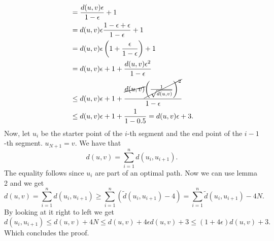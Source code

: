 \documentclass[11pt]{article}
\begin{document}
\begin{enumerate}
\begin{align*}
          & = \frac{d(u,v)\epsilon}{1 - \epsilon} + 1\\
          &=  d(u,v)\epsilon \frac{1-\epsilon+\epsilon}{1-\epsilon} + 1 \\
          &= d(u,v)\epsilon \left(1+\frac{\epsilon}{1-\epsilon}\right) + 1\\
          &= d(u,v)\epsilon + 1 + \frac{ d(u,v)\epsilon^2}{1-\epsilon}\\
          &\leq d(u,v)\epsilon + 1 + \frac{ \cancel{d(u,v)}\cancel{\left(\frac{1}{\sqrt{d(u,v)}}\right)^2}}{1-\epsilon}\\
          & \leq d(u,v)\epsilon + 1 + \frac{1}{1-0.5} = d(u,v)\epsilon + 3.
    \end{align*}
    Now, let $u_i$ be the starter point of the $i$-th segment and the end point of the $i-1$-th segment. $u_{N+1} = v$. We have that
    \begin{equation*}
        d(u,v) = \sum_{i = 1}^n d(u_i, u_{i+1}).
    \end{equation*}
    The equality follows since $u_i$ are part of an optimal path. Now we can use lemma 2 and we get
    \begin{equation*}
        d(u,v) = \sum_{i = 1}^n d(u_i, u_{i+1}) \geq \sum_{i = 1}^n (\tilde d(u_i, u_{i+1})-4) = \sum_{i = 1}^n \tilde d(u_i, u_{i+1}) - 4N.
    \end{equation*}
    By looking at it right to left we get
    \begin{equation*}
        d(u_i, u_{i+1}) \leq d(u,v) + 4N \leq d(u,v) + 4\epsilon d(u,v) + 3 \leq (1+4\epsilon)d(u,v) + 3.
    \end{equation*}
    Which concludes the proof.
\end{enumerate}
    
\end{document}

